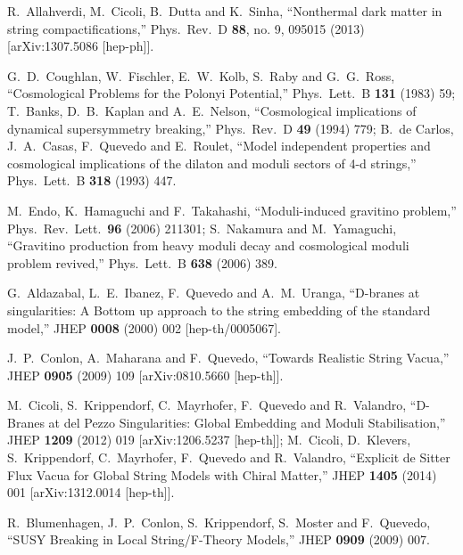 \documentclass[11pt,a4paper]{article}
\begin{document}
\begin{thebibliography}{99}
R.~Allahverdi, M.~Cicoli, B.~Dutta and K.~Sinha,
  ``Nonthermal dark matter in string compactifications,''
  Phys.\ Rev.\ D {\bf 88}, no. 9, 095015 (2013)
  [arXiv:1307.5086 [hep-ph]].

G.~D.~Coughlan, W.~Fischler, E.~W.~Kolb, S.~Raby and G.~G.~Ross,
  ``Cosmological Problems for the Polonyi Potential,''
  Phys.\ Lett.\ B {\bf 131} (1983) 59;
T.~Banks, D.~B.~Kaplan and A.~E.~Nelson,
  ``Cosmological implications of dynamical supersymmetry breaking,''
  Phys.\ Rev.\ D {\bf 49} (1994) 779;
B.~de Carlos, J.~A.~Casas, F.~Quevedo and E.~Roulet,
  ``Model independent properties and cosmological implications of the dilaton and moduli sectors of 4-d strings,''
  Phys.\ Lett.\ B {\bf 318} (1993) 447.

M.~Endo, K.~Hamaguchi and F.~Takahashi,
  ``Moduli-induced gravitino problem,''
  Phys.\ Rev.\ Lett.\  {\bf 96} (2006) 211301;
S.~Nakamura and M.~Yamaguchi,
  ``Gravitino production from heavy moduli decay and cosmological moduli problem revived,''
  Phys.\ Lett.\ B {\bf 638} (2006) 389.

  G.~Aldazabal, L.~E.~Ibanez, F.~Quevedo and A.~M.~Uranga,
  ``D-branes at singularities: A Bottom up approach to the string embedding of the standard model,''
  JHEP {\bf 0008} (2000) 002
  [hep-th/0005067].

  J.~P.~Conlon, A.~Maharana and F.~Quevedo,
  ``Towards Realistic String Vacua,''
  JHEP {\bf 0905} (2009) 109
  [arXiv:0810.5660 [hep-th]].

M.~Cicoli, S.~Krippendorf, C.~Mayrhofer, F.~Quevedo and R.~Valandro,
  ``D-Branes at del Pezzo Singularities: Global Embedding and Moduli Stabilisation,''
  JHEP {\bf 1209} (2012) 019
  [arXiv:1206.5237 [hep-th]];
M.~Cicoli, D.~Klevers, S.~Krippendorf, C.~Mayrhofer, F.~Quevedo and R.~Valandro,
  ``Explicit de Sitter Flux Vacua for Global String Models with Chiral Matter,''
  JHEP {\bf 1405} (2014) 001
  [arXiv:1312.0014 [hep-th]].

R.~Blumenhagen, J.~P.~Conlon, S.~Krippendorf, S.~Moster and F.~Quevedo,
  ``SUSY Breaking in Local String/F-Theory Models,''
  JHEP {\bf 0909} (2009) 007.


\end{thebibliography}
\end{document}

